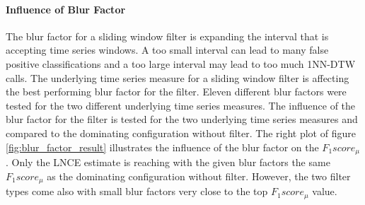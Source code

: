 \paragraph{Influence of Blur Factor} \label{influence_of_blur_factor}
The blur factor for a sliding window filter is expanding the interval that is accepting time series windows. A too small
interval can lead to many false positive classifications and a too large interval may lead to too much 1NN-DTW calls.
The underlying time series measure for a sliding window filter is affecting the best performing blur factor for the
filter. Eleven different blur factors were tested for the two different underlying time series measures. The influence of
the blur factor for the filter is tested for the two underlying time series measures and compared to the
dominating configuration without filter. The right plot of figure \ref{fig:blur_factor_result} illustrates the influence
of the blur factor on the $F_{1}score_{\mu}$. Only the LNCE estimate is reaching with the given blur factors the same
$F_{1}score_{\mu}$ as the dominating configuration without filter. However, the two filter types come also with small
blur factors very close to the top $F_{1}score_{\mu}$ value.

